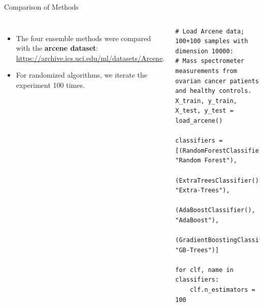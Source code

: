 \documentclass[10pt, aspectratio=169]{beamer} %
\begin{document}
\begin{frame}[fragile]{Comparison of Methods}
\begin{columns}
\begin{itemize}
	\item The four ensemble methods were compared with the \textbf{arcene dataset}:
	\url{https://archive.ics.uci.edu/ml/datasets/Arcene}.
	\item For randomized algorithms, we iterate the experiment 100 times.
\end{itemize}
\begin{lstlisting}
# Load Arcene data; 100+100 samples with dimension 10000:
# Mass spectrometer measurements from ovarian cancer patients and healthy controls.
X_train, y_train, X_test, y_test = load_arcene()

classifiers = [(RandomForestClassifier(), "Random Forest"),
               (ExtraTreesClassifier(), "Extra-Trees"),
               (AdaBoostClassifier(), "AdaBoost"),
               (GradientBoostingClassifier(), "GB-Trees")]
           
for clf, name in classifiers:
    clf.n_estimators = 100
    

\end{lstlisting}
\end{columns}
\end{frame}
\end{document}
